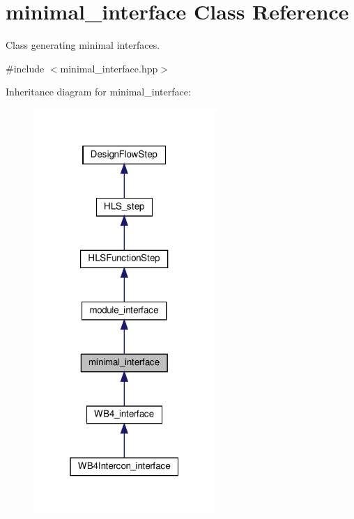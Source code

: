 \hypertarget{classminimal__interface}{}\section{minimal\+\_\+interface Class Reference}
\label{classminimal__interface}


Class generating minimal interfaces.  




{\ttfamily \#include $<$minimal\+\_\+interface.\+hpp$>$}



Inheritance diagram for minimal\+\_\+interface\+:
\nopagebreak
\begin{figure}[H]
\begin{center}
\leavevmode
\includegraphics[width=196pt]{dd/de9/classminimal__interface__inherit__graph}
\end{center}
\end{figure}


